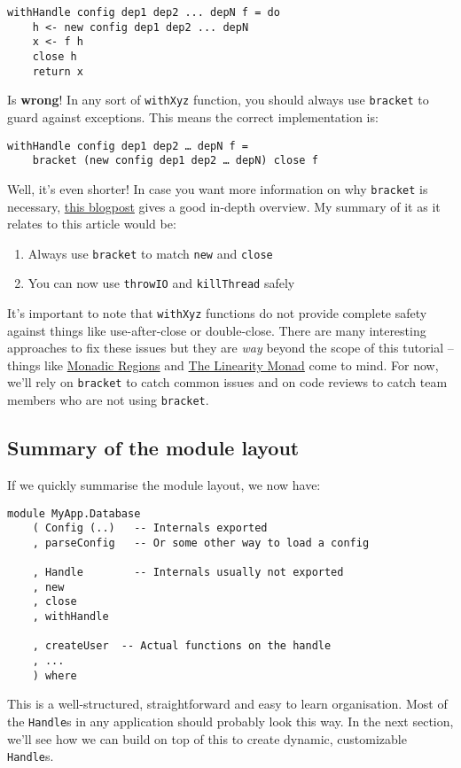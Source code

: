 \begin{verbatim}
withHandle config dep1 dep2 ... depN f = do
    h <- new config dep1 dep2 ... depN
    x <- f h
    close h
    return x
\end{verbatim}
Is \textbf{wrong}! In any sort of \texttt{withXyz} function, you should
always use \texttt{bracket} to guard against exceptions. This means the
correct implementation is:

\begin{verbatim}
withHandle config dep1 dep2 … depN f =
    bracket (new config dep1 dep2 … depN) close f
\end{verbatim}
Well, it's even shorter! In case you want more information on why
\texttt{bracket} is necessary,
\href{http://www.well-typed.com/blog/97/}{this blogpost} gives a good
in-depth overview. My summary of it as it relates to this article would
be:

\begin{enumerate}
\item
  Always use \texttt{bracket} to match \texttt{new} and \texttt{close}
\item
  You can now use \texttt{throwIO} and \texttt{killThread} safely
\end{enumerate}
It's important to note that \texttt{withXyz} functions do not provide
complete safety against things like use-after-close or double-close.
There are many interesting approaches to fix these issues but they are
\emph{way} beyond the scope of this tutorial -- things like
\href{http://okmij.org/ftp/Haskell/regions.html}{Monadic Regions} and
\href{https://www.cis.upenn.edu/~jpaykin/papers/pz_linearity_monad_2017.pdf}{The
Linearity Monad} come to mind. For now, we'll rely on \texttt{bracket}
to catch common issues and on code reviews to catch team members who are
not using \texttt{bracket}.

\subsection{Summary of the module layout}

If we quickly summarise the module layout, we now have:

\begin{verbatim}
module MyApp.Database
    ( Config (..)   -- Internals exported
    , parseConfig   -- Or some other way to load a config

    , Handle        -- Internals usually not exported
    , new
    , close
    , withHandle

    , createUser  -- Actual functions on the handle
    , ...
    ) where
\end{verbatim}
This is a well-structured, straightforward and easy to learn
organisation. Most of the \texttt{Handle}s in any application should
probably look this way. In the next section, we'll see how we can build
on top of this to create dynamic, customizable \texttt{Handle}s.

